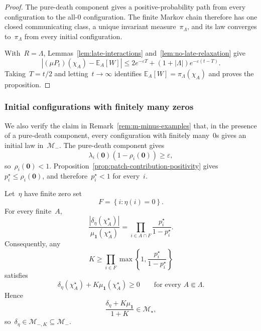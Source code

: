 \documentclass[EJP,preprint,NODS,nobera]{ejpecp}
\newcommand{\E}{\mathbb{E}}
\newcommand{\bb}[1]{\left(#1\right)}
\newcommand{\Cb}[1]{\left[#1\right]}
\newcommand{\cb}[1]{\left\{#1\right\}}
\newcommand{\abs}[1]{\left|#1\right|}
\newcommand{\mb}[1]{\mathbf{#1}}
\newcommand{\rev}[1]{{\color{red}#1}}
\begin{document}
{\color{red}
\begin{proof}
The pure-death component gives a positive-probability path from every
configuration to the all-$0$ configuration. The finite Markov chain therefore
has one closed communicating class, a unique invariant measure~$\pi_\Lambda$,
and its law converges to~$\pi_\Lambda$ from every initial configuration.

With~$R=\Lambda$, Lemmas~\ref{lem:late-interactions}
and~\ref{lem:no-late-relaxation} give
\begin{equation*}
\abs{(\mu P_t)(\chi_A)-\E_A\Cb W}
\leq2e^{-\varepsilon T}+(1+\abs\Lambda)e^{-\varepsilon(t-T)}.
\end{equation*}
Taking~$T=t/2$ and letting~$t\to\infty$ identifies
$\E_A\Cb W=\pi_\Lambda(\chi_A)$ and proves the proposition.
\end{proof}
}

\subsubsection{\texorpdfstring{\rev{Initial configurations with finitely many zeros}}{Initial configurations with finitely many zeros}}
\label{subsec:finite-zero-configurations}

We also verify the claim in Remark~\ref{rem:m-minus-examples}
that, in the presence of a pure-death component, every configuration with finitely many~$0$s gives an initial law in~$\mathcal M_-$. The pure-death component gives
\begin{equation*}
\lambda_i(\mb 0)\bb{1-\rho_i(\mb 0)}
\geq
\varepsilon,
\end{equation*}
so~$\rho_i(\mb 0)<1$. Proposition~\ref{prop:patch-contribution-positivity}
gives~$p_i^\star\leq\rho_i(\mb 0)$, and therefore~$p_i^\star<1$ for every~$i$.

Let~$\eta$ have finite zero set
\begin{equation*}
F
=
\cb{i:\eta(i)=0}.
\end{equation*}
For every finite~$A$,
\begin{equation*}
\frac{
\abs{\delta_\eta(\chi_A^\star)}
}{
\mu_{\mb 1}(\chi_A^\star)
}
=
\prod_{i\in A\cap F}
\frac{p_i^\star}{1-p_i^\star}.
\end{equation*}
Consequently, any
\begin{equation*}
K
\geq
\prod_{i\in F}
\max\cb{
1,
\frac{p_i^\star}{1-p_i^\star}
}
\end{equation*}
satisfies
\begin{equation*}
\delta_\eta(\chi_A^\star)
+
K\mu_{\mb 1}(\chi_A^\star)
\geq0
\qquad
\text{for every }A\Subset\Lambda.
\end{equation*}
Hence
\begin{equation*}
\frac{\delta_\eta+K\mu_{\mb 1}}{1+K}
\in
\mathcal M_\star,
\end{equation*}
so~$\delta_\eta\in\mathcal M_{-,K}\subseteq\mathcal M_-$.
\end{document}
